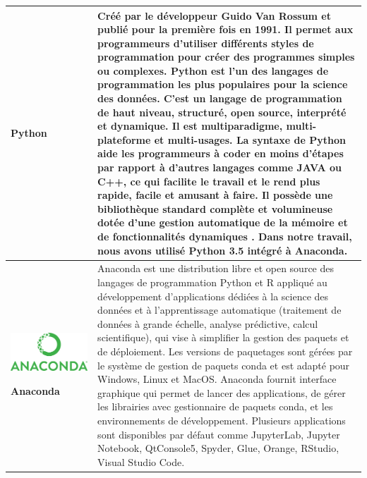 \begin{table}[H]
\begin{tabular}{|m{5cm}|m{14cm}|}
\begin{center}
\begin{minipage}{.3\textwidth}
    \end{minipage}
	\end{center}
	\centering \textbf{Python} \cite{10.5555/1593511} & Créé par le développeur Guido Van Rossum et publié pour la première fois en 1991. Il permet aux programmeurs d'utiliser différents styles de programmation pour créer des programmes simples ou complexes. Python est l'un des langages de programmation les plus populaires pour la science des données. C'est un langage de programmation de haut niveau, structuré, open source, interprété et dynamique. Il est multiparadigme, multi-plateforme et multi-usages. La syntaxe de Python aide les programmeurs à coder en moins d'étapes par rapport à d'autres langages comme JAVA ou C++, ce qui facilite le travail et le rend plus rapide, facile et amusant à faire. Il possède une bibliothèque standard complète et volumineuse dotée d'une gestion automatique de la mémoire et de fonctionnalités dynamiques \cite{python_cours}. Dans notre travail, nous avons utilisé Python 3.5 intégré à Anaconda. \\ \hline
  \begin{center}
	    \begin{minipage}{.3\textwidth}
      \includegraphics[width=\textwidth]{images/chapitre7/anaconda.png}
    \end{minipage}
	\end{center}
	\centering \textbf{Anaconda} & Anaconda \cite{anaconda_citation} est une distribution libre et open source \cite{anaconda_website} des langages de programmation Python et R appliqué au développement d'applications dédiées à la science des données et à l'apprentissage automatique (traitement de données à grande échelle, analyse prédictive, calcul scientifique), qui vise à simplifier la gestion des paquets et de déploiement. Les versions de paquetages sont gérées par le système de gestion de paquets conda \cite{conda_website} et est adapté pour Windows, Linux et MacOS. Anaconda fournit interface graphique qui permet de lancer des applications, de gérer les librairies avec gestionnaire de paquets conda, et les environnements de développement. Plusieurs applications sont disponibles par défaut comme JupyterLab, Jupyter Notebook, QtConsole5, Spyder, Glue, Orange, RStudio, Visual Studio Code.  \\ \hline
  

\end{tabular}
\end{table}
